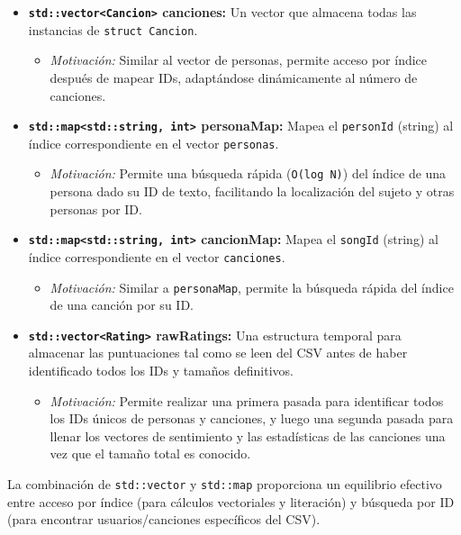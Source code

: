 \documentclass{article}
\begin{document}
\begin{itemize}[label=\textbullet]
\begin{itemize}[label=\textendash]
    \end{itemize}
    \item \textbf{\texttt{std::vector\textless{}Cancion\textgreater{}} canciones:} Un vector que almacena todas las instancias de \texttt{struct Cancion}.
    \begin{itemize}[label=\textendash]
        \item \textit{Motivación:} Similar al vector de personas, permite acceso por índice después de mapear IDs, adaptándose dinámicamente al número de canciones.
    \end{itemize}
    \item \textbf{\texttt{std::map\textless{}std::string, int\textgreater{}} personaMap:} Mapea el \texttt{personId} (string) al índice correspondiente en el vector \texttt{personas}.
    \begin{itemize}[label=\textendash]
        \item \textit{Motivación:} Permite una búsqueda rápida (\texttt{O(log N)}) del índice de una persona dado su ID de texto, facilitando la localización del sujeto y otras personas por ID.
    \end{itemize}
    \item \textbf{\texttt{std::map\textless{}std::string, int\textgreater{}} cancionMap:} Mapea el \texttt{songId} (string) al índice correspondiente en el vector \texttt{canciones}.
    \begin{itemize}[label=\textendash]
        \item \textit{Motivación:} Similar a \texttt{personaMap}, permite la búsqueda rápida del índice de una canción por su ID.
    \end{itemize}
    \item \textbf{\texttt{std::vector\textless{}Rating\textgreater{}} rawRatings:} Una estructura temporal para almacenar las puntuaciones tal como se leen del CSV antes de haber identificado todos los IDs y tamaños definitivos.
    \begin{itemize}[label=\textendash]
        \item \textit{Motivación:} Permite realizar una primera pasada para identificar todos los IDs únicos de personas y canciones, y luego una segunda pasada para llenar los vectores de sentimiento y las estadísticas de las canciones una vez que el tamaño total es conocido.
    \end{itemize}
\end{itemize}

La combinación de \texttt{std::vector} y \texttt{std::map} proporciona un equilibrio efectivo entre acceso por índice (para cálculos vectoriales y literación) y búsqueda por ID (para encontrar usuarios/canciones específicos del CSV).
\end{document}
